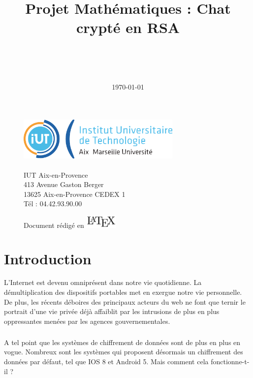 \documentclass[12pt,a4paper]{report}
\begin{document}
\begin{figure}[!t]
\includegraphics[width = 80mm]{logo.jpg}
\\
\\
IUT Aix-en-Provence\\
413 Avenue Gaston Berger\\
13625 Aix-en-Provence CEDEX 1\\
Tél : 04.42.93.90.00\\
\end{figure}
\title{Projet Mathématiques : Chat crypté en RSA}
\author{
	\\
	\\ 
	\\
	}
\date{\today}
\begin{figure}[!b]
\centering
Document rédigé en 
\includegraphics[width = 16mm]{latex1.jpg}
\end{figure}
\maketitle

\tableofcontents
\chapter{Introduction}
	L’Internet est devenu omniprésent dans notre vie quotidienne. La démultiplication des dispositifs portables met en exergue notre vie personnelle. De plus, les récents déboires des principaux acteurs du web ne font que ternir le portrait d’une vie privée déjà affaiblit par les intrusions de plus en plus oppressantes menées  par les agences gouvernementales.
\paragraph{}	
A tel point que les systèmes de chiffrement de données sont de plus en plus en vogue. Nombreux sont les systèmes qui proposent désormais un chiffrement des données par défaut, tel que IOS 8 et Android 5. Mais comment cela fonctionne-t-il ?
\end{document}

